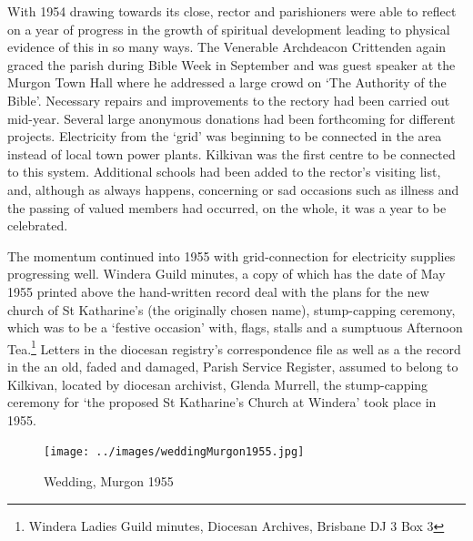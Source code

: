 With 1954 drawing towards its close, rector and parishioners were able to reflect on a year of progress in the growth of spiritual development leading to physical evidence of this in so many ways. The Venerable Archdeacon Crittenden again graced the parish during Bible Week in September and was guest speaker at the Murgon Town Hall where he addressed a large crowd on `The Authority of the Bible'. Necessary repairs and improvements to the rectory had been carried out mid-year. Several large anonymous donations had been forthcoming for different projects. Electricity from the `grid' was beginning to be connected in the area instead of local town power plants. Kilkivan was the first centre to be connected to this system. Additional schools had been added to the rector's visiting list, and, although as always happens, concerning or sad occasions such as illness and the passing of valued members had occurred, on the whole, it was a year to be celebrated.



The momentum continued into 1955 with grid-connection for electricity supplies progressing well. Windera Guild minutes, a copy of which has the date of May 1955 printed above the hand-written record deal with the plans for the new church of St Katharine's (the originally chosen name), stump-capping ceremony, which was to be a `festive occasion' with, flags, stalls and a sumptuous Afternoon Tea.\footnote{Windera Ladies Guild minutes, Diocesan Archives, Brisbane DJ 3 Box 3} Letters in the diocesan registry's correspondence file as well as a the record in the an old, faded and damaged, Parish Service Register, assumed to belong to Kilkivan, located by diocesan archivist, Glenda Murrell, the stump-capping ceremony for `the proposed St Katharine's Church at Windera' took place in 1955.








\begin{figure}
\begin{center}
\texttt{[image: ../images/weddingMurgon1955.jpg]}
\caption{Wedding, Murgon 1955}
\end{center}
\end{figure}










